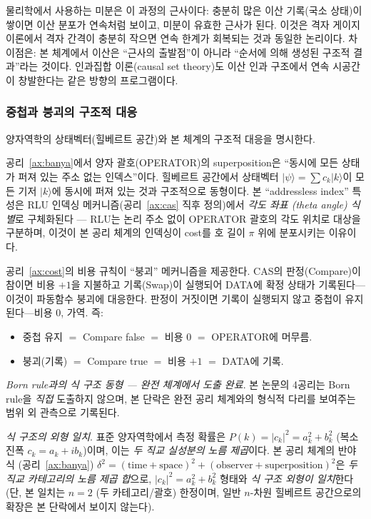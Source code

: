 \documentclass[entropy,article,submit,pdftex,oneauthor]{Definitions/mdpi}
\begin{document}
물리학에서 사용하는 미분은 이 과정의 근사이다: 충분히 많은 이산 기록(국소 상태)이 쌓이면 이산 분포가 연속처럼 보이고, 미분이 유효한 근사가 된다. 이것은 격자 게이지이론에서 격자 간격이 충분히 작으면 연속 한계가 회복되는 것과 동일한 논리이다. 차이점은: 본 체계에서 이산은 ``근사의 출발점''이 아니라 ``순서에 의해 생성된 구조적 결과''라는 것이다. 인과집합 이론(causal set theory)도 이산 인과 구조에서 연속 시공간이 창발한다는 같은 방향의 프로그램이다.

\subsubsection{중첩과 붕괴의 구조적 대응}

양자역학의 상태벡터(힐베르트 공간)와 본 체계의 구조적 대응을 명시한다.

공리~\ref{ax:banya}에서 양자 괄호(OPERATOR)의 superposition은 ``동시에 모든 상태가 퍼져 있는 주소 없는 인덱스''이다. 힐베르트 공간에서 상태벡터 $|\psi\rangle = \sum c_k |k\rangle$이 모든 기저 $|k\rangle$에 동시에 퍼져 있는 것과 구조적으로 동형이다. 본 ``addressless index'' 특성은 RLU 인덱싱 메커니즘(공리~\ref{ax:cas} 직후 정의)에서 \emph{각도 좌표 (theta angle) 식별}로 구체화된다 — RLU는 논리 주소 없이 OPERATOR 괄호의 각도 위치로 대상을 구분하며, 이것이 본 공리 체계의 인덱싱이 cost를 호 길이 $\pi$ 위에 분포시키는 이유이다.

공리~\ref{ax:cost}의 비용 규칙이 ``붕괴'' 메커니즘을 제공한다. CAS의 판정(Compare)이 참이면 비용 $+1$을 지불하고 기록(Swap)이 실행되어 DATA에 확정 상태가 기록된다---이것이 파동함수 붕괴에 대응한다. 판정이 거짓이면 기록이 실행되지 않고 중첩이 유지된다---비용 $0$, 가역. 즉:
\begin{itemize}
\item 중첩 유지 $=$ Compare false $=$ 비용 $0$ $=$ OPERATOR에 머무름.
\item 붕괴(기록) $=$ Compare true $=$ 비용 $+1$ $=$ DATA에 기록.
\end{itemize}

\emph{Born rule과의 식 구조 동형 --- 완전 체계에서 도출 완료}. 본 논문의 4공리는 Born rule을 \emph{직접} 도출하지 않으며, 본 단락은 완전 공리 체계와의 형식적 다리를 보여주는 범위 외 관측으로 기록된다.

\emph{식 구조의 외형 일치}. 표준 양자역학에서 측정 확률은 $P(k) = |c_k|^2 = a_k^2 + b_k^2$ (복소 진폭 $c_k = a_k + i b_k$)이며, 이는 \emph{두 직교 실성분의 노름 제곱}이다. 본 공리 체계의 반야식 (공리~\ref{ax:banya}) $\delta^2 = (\text{time}+\text{space})^2 + (\text{observer}+\text{superposition})^2$은 \emph{두 직교 카테고리의 노름 제곱 합}으로, $|c_k|^2 = a_k^2 + b_k^2$ 형태와 \emph{식 구조 외형이 일치}한다 (단, 본 일치는 $n=2$ (두 카테고리/괄호) 한정이며, 일반 $n$-차원 힐베르트 공간으로의 확장은 본 단락에서 보이지 않는다).
\end{document}
